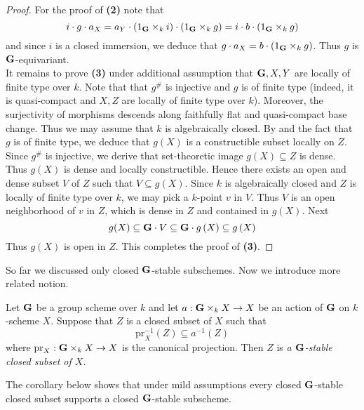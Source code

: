 \begin{proof}
For the proof of \textbf{(2)} note that 
$$i\cdot g\cdot a_X = a_Y\cdot \left(1_{\mathbf{G}}\times_k i\right)\cdot \left(1_{\mathbf{G}}\times_k g\right) = i\cdot b\cdot \left(1_{\mathbf{G}}\times_k g\right)$$
and since $i$ is a closed immersion, we deduce that $g\cdot a_X = b\cdot \left(1_{\mathbf{G}}\times_k g\right)$. Thus $g$ is $\mathbf{G}$-equivariant.\\
It remains to prove \textbf{(3)} under additional assumption that $\mathbf{G},X,Y$ are locally of finite type over $k$. Note that that $g^{\#}$ is injective and $g$ is of finite type (indeed, it is quasi-compact and $X,Z$ are locally of finite type over $k$). Moreover, the surjectivity of morphisms descends along faithfully flat and quasi-compact base change. Thus we may assume that $k$ is algebraically closed. By {\cite[Theorem 10.20]{gortz2010algebraic}} and the fact that $g$ is of finite type, we deduce that $g\left(X\right)$ is a constructible subset locally on $Z$. Since $g^{\#}$ is injective, we derive that set-theoretic image $g\left(X\right)\subseteq Z$ is dense. Thus $g\left(X\right)$ is dense and locally constructible. Hence there exists an open and dense subset $V$ of $Z$ such that $V\subseteq g\left(X\right)$. Since $k$ is algebraically closed and $Z$ is locally of finite type over $k$, we may pick a $k$-point $v$ in $V$. Thus $V$ is an open neighborhood of $v$ in $Z$, which is dense in $Z$ and contained in $g\left(X\right)$. Next
$$g(X) \subseteq \mathbf{G}\cdot V \subseteq \mathbf{G} \cdot g\left(X\right)\subseteq g\left(X\right)$$
Thus $g(X)$ is open in $Z$. This completes the proof of \textbf{(3)}.
\end{proof}
\noindent
So far we discussed only closed $\mathbf{G}$-stable subschemes. Now we introduce more related notion.

\begin{definition}
Let $\mathbf{G}$ be a group scheme over $k$ and let $a:\mathbf{G}\times_k X\rightarrow X$ be an action of $\mathbf{G}$ on $k$-scheme $X$. Suppose that $Z$ is a closed subset of $X$ such that 
$$\mathrm{pr}_X^{-1}(Z) \subseteq a^{-1}(Z)$$
where $\mathrm{pr}_X:\mathbf{G}\times_kX\rightarrow X$ is the canonical projection. Then $Z$ is \textit{a $\mathbf{G}$-stable closed subset of $X$}. 
\end{definition}
\noindent
The corollary below shows that under mild assumptions every closed $\mathbf{G}$-stable closed subset supports a closed $\mathbf{G}$-stable subscheme.


